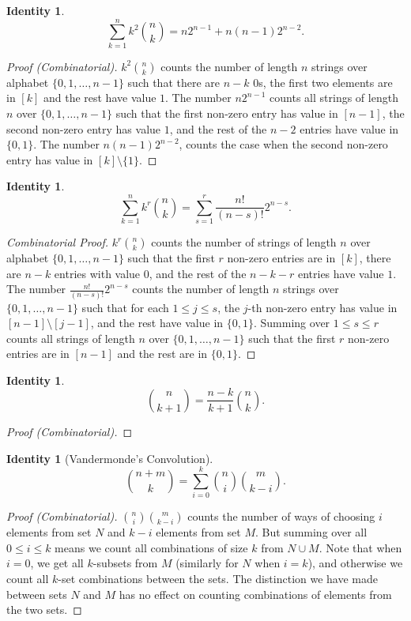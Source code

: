 \documentclass[12]{article}
\newcounter{identityCounter}
\newtheorem{iden}[identityCounter]{Identity}
\theoremstyle{definition}
\begin{document}
	\begin{iden}
		$$\sum_{k=1}^n k^2{n \choose k} = n2^{n-1} + n(n-1)2^{n-2}.$$
	\end{iden}
	\begin{proof}[Proof (Combinatorial)]
		$k^2 { n \choose k}$ counts the number of length $n$ strings over alphabet $\{0, 1, \ldots, n-1\}$ such that there are $n-k$ $0$s, the first two elements are in $[k]$ and the rest have value $1$.  The number $n2^{n-1}$ counts all strings of length $n$ over $\{0, 1, \ldots, n-1\}$ such that the first non-zero entry has value in $[n-1]$, the second non-zero entry has value $1$, and the rest of the $n-2$ entries have value in $\{0,1\}$.  The number $n(n-1)2^{n-2}$, counts the case when the second non-zero entry has value in $[k] \setminus \{1\}$.
	\end{proof}

	\begin{iden}
		
		$$\sum_{k = 1}^n k^r {n \choose k} = \sum_{s = 1}^r \frac{n!}{(n-s)!}2^{n-s}.$$
	\end{iden}
	\begin{proof}[Combinatorial Proof]
		$k^r {n \choose k}$ counts the number of strings of length $n$ over alphabet $\{0, 1, \ldots, n-1\}$ such that the first $r$ non-zero entries are in $[k]$, there are $n-k$ entries with value $0$, and the rest of the $n-k-r$ entries have value $1$.  The number $\frac{n!}{(n-s)!}2^{n-s}$ counts the number of length $n$ strings over $\{0, 1, \ldots, n-1\}$ such that for each $1 \leq j \leq s$, the $j$-th non-zero entry has value in $[n-1] \setminus [j-1]$, and the rest have value in $\{0,1\}$.  Summing over $1 \leq s \leq r$ counts all strings of length $n$ over $\{0, 1, \ldots, n-1\}$ such that the first $r$ non-zero entries are in $[n-1]$ and the rest are in $\{0,1\}$.
	\end{proof}
	
	\begin{iden}
		$${n \choose k+1} = \frac{n-k}{k+1}{n \choose k}.$$
	\end{iden}
	\begin{proof}[Proof (Combinatorial)]
		
	\end{proof}
	
	\begin{iden}[Vandermonde's Convolution]
		$${n+m \choose k} = \sum_{i=0}^k {n \choose i}{m \choose k-i}.$$
	\end{iden}
	\begin{proof}[Proof (Combinatorial)]
		${n \choose i}{m \choose k-i}$ counts the number of ways of choosing $i$ elements from set $N$ and $k-i$ elements from set $M$.  But summing over all $0 \leq i \leq k$ means we count all combinations of size $k$ from $N \cup M$.  Note that when $i = 0$, we get all $k$-subsets from $M$ (similarly for $N$ when $i = k$), and otherwise we count all $k$-set combinations between the sets.  The distinction we have made between sets $N$ and $M$ has no effect on counting combinations of elements from the two sets.
	\end{proof}
	
\end{document}
